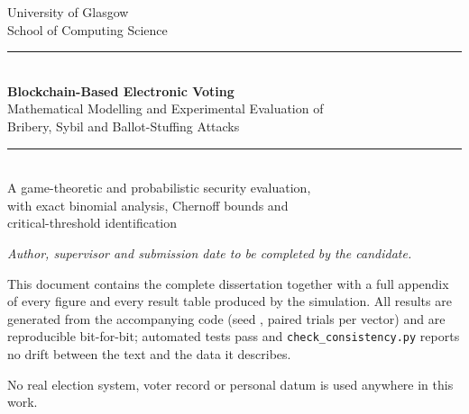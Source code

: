 \documentclass[11pt,a4paper]{article}
\newcommand{\code}[1]{\texttt{\small #1}}
\begin{document}
\begin{titlepage}
\thispagestyle{empty}
\centering
\vspace*{1.0cm}

{\sffamily\Large University of Glasgow}\\[2pt]
{\sffamily\normalsize School of Computing Science}\\[2.6cm]

{\color{rule}\rule{\textwidth}{0.9pt}}\\[0.65cm]
{\sffamily\LARGE\bfseries Blockchain-Based Electronic Voting}\\[0.40cm]
{\sffamily\Large Mathematical Modelling and Experimental Evaluation of}\\[0.16cm]
{\sffamily\Large Bribery, Sybil and Ballot-Stuffing Attacks}\\[0.65cm]
{\color{rule}\rule{\textwidth}{0.9pt}}\\[1.1cm]

{\large A game-theoretic and probabilistic security evaluation,}\\[3pt]
{\large with exact binomial analysis, Chernoff bounds and}\\[3pt]
{\large critical-threshold identification}\\[1.8cm]

\begin{minipage}{0.8\textwidth}
\centering\itshape
Author, supervisor and submission date to be completed by the candidate.
\end{minipage}

\vspace{1.2cm}
\begin{minipage}{0.86\textwidth}
\centering\small
This document contains the complete dissertation together with a full
appendix of every figure and every result table produced by the
simulation. All results are generated from the accompanying code
(seed \Seed, \TotalTrials{} paired trials per vector) and are
reproducible bit-for-bit; \TestCount{} automated tests pass and
\code{check\_consistency.py} reports no drift between the text and the
data it describes.
\end{minipage}

\vfill
{\footnotesize\color{inkmuted}
No real election system, voter record or personal datum is used anywhere in this work.}
\end{titlepage}
\clearpage




\clearpage
\end{document}
